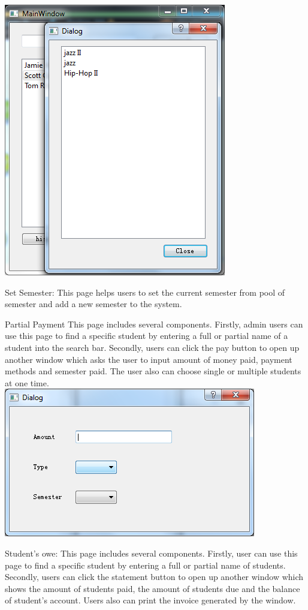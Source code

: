 \includegraphics[scale=0.5]{teacherHistory.png}

Set Semester:
This page helps users to set the current semester from pool of semester and add a new semester to the system.

Partial Payment
This page includes several components. Firstly, admin users can use this page to find a specific student by entering a full or partial name of a student into the search bar. Secondly, users can click the pay button to open up another window which asks the user to input amount of money paid, payment methods and semester paid. The user also can choose single or multiple students at one time. \\

\includegraphics[scale=0.5]{payment.png}

Student's owe:
This page includes several components. Firstly, user can use this page to find a specific student by entering a full or partial name of students. Secondly, users can click the statement button to open up another window which shows the amount of students paid, the amount of students due and the balance of student's account. Users also can print the invoice generated by the window.\\

